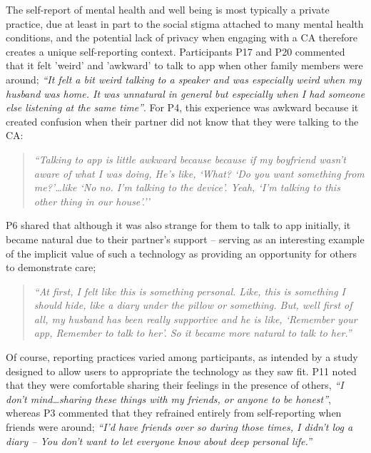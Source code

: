             The self-report of mental health and well being is most typically a private practice, due at least in part to the social stigma attached to many mental health conditions, and the potential lack of privacy when engaging with a \ac{CA} therefore creates a unique self-reporting context. Participants P17 and P20 commented that it felt 'weird' and 'awkward' to talk to \acl{app} when other family members were around; \textit{``It felt a bit weird talking to a speaker and was especially weird when my husband was home. It was unnatural in general but especially when I had someone else listening at the same time''}. For P4, this experience was awkward because it created confusion when their partner did not know that they were talking to the \ac{CA}:
            
                \begin{quote}
                \vspace{2mm}
                    \textit{``Talking to \acl{app} is little awkward because because if my boyfriend wasn't aware of what I was doing, He's like, `What? `Do you want something from me?'\ldots like `No no. I'm talking to the device'. Yeah, `I'm talking to this other thing in our house'.''} %
                \vspace{2mm}
                \end{quote} 
            
            P6 shared that although it was also strange for them to talk to \acl{app} initially, it became natural due to their partner's support -- serving as an interesting example of the implicit value of such a technology as providing an opportunity for others to demonstrate care;
            
                \begin{quote}
                \vspace{2mm}
                    \textit{``At first, I felt like this is something personal. Like, this is something I should hide, like a diary under the pillow or something. But, well first of all, my husband has been really supportive and he is like, `Remember your \acl{app}, Remember to talk to her'. So it became more natural to talk to her.''} %
                \vspace{2mm}
                \end{quote} 
            
            Of course, reporting practices varied among participants, as intended by a study designed to allow users to appropriate the technology as they saw fit. P11 noted that they were comfortable sharing their feelings in the presence of others, \textit{``I don't mind\ldots sharing these things with my friends, or anyone to be honest''}, whereas P3 commented that they refrained entirely from self-reporting when friends were around; \textit{``I’d have friends over so during those times, I didn’t log a diary -- You don’t want to let everyone know about deep personal life.''}
  
